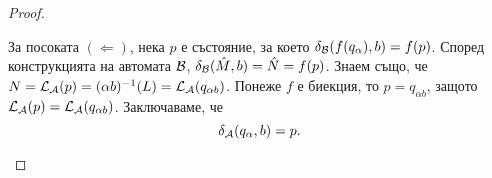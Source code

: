 \begin{proof}
\begin{itemize}
    За посоката $(\Leftarrow)$, нека $p$ е състояние, за което $\delta_{\mathcal{B}}(f(q_{\alpha}),b) = f(p)$.
    Според конструкцията на автомата $\mathcal{B}$, $\delta_{\mathcal{B}}(\hat{M},b) = \hat{N} = f(p)$.
    Знаем също, че $N = \mathcal{L}_{\mathcal{A}}(p) = (\alpha b)^{-1}(L) = \mathcal{L}_{\mathcal{A}}(q_{\alpha b})$.
    Понеже $f$ е биекция, то $p = q_{\alpha b}$, защото $\mathcal{L}_{\mathcal{A}}(p) = \mathcal{L}_{\mathcal{A}}(q_{\alpha b})$.
    Заключаваме, че \[\delta_{\mathcal{A}}(q_\alpha,b) = p.\]
  \end{itemize}
\end{proof}

